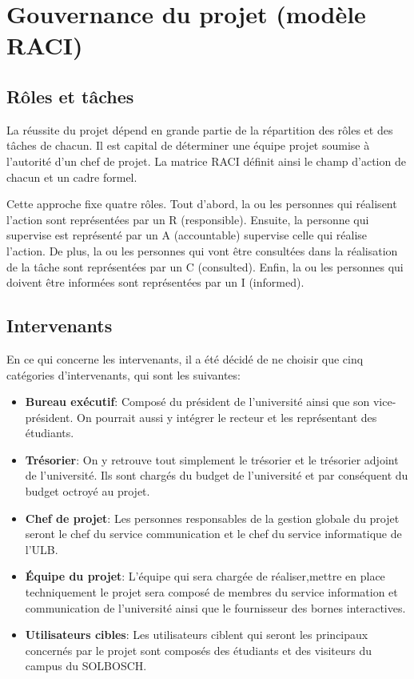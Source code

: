 \chapter{Gouvernance du projet (modèle RACI)}

\section{Rôles et tâches}
La réussite du projet dépend en grande partie de la répartition des rôles et des tâches de chacun.  Il est capital de déterminer une équipe projet soumise à l’autorité d’un chef de projet. La matrice RACI définit ainsi le champ d’action de chacun et un cadre formel. 

Cette approche fixe quatre rôles. Tout d’abord, la ou les personnes qui réalisent l’action sont représentées par un R (responsible).  Ensuite, la personne qui supervise est représenté par un A (accountable) supervise celle qui réalise l’action. De plus, la ou les personnes qui vont être consultées dans la réalisation de la tâche sont représentées par un C (consulted). Enfin, la ou les personnes qui doivent être informées sont représentées par un I (informed). 




\section{Intervenants}
En ce qui concerne les intervenants, il a été décidé de ne choisir que cinq catégories d’intervenants, qui sont les suivantes:

\begin{itemize}
    \item \textbf{Bureau exécutif}: Composé du président de l’université ainsi que son vice-président. On pourrait aussi y intégrer le recteur et les représentant des étudiants. 

    \item \textbf{Trésorier}: On y retrouve tout simplement le trésorier et le trésorier adjoint de l’université. Ils sont chargés du budget de l’université et par conséquent du budget octroyé au projet. 

    \item \textbf{Chef de projet}: Les personnes responsables de la gestion globale du projet seront le chef du service communication et le chef du service informatique de l’ULB. 

    \item \textbf{Équipe du projet}: L’équipe qui sera chargée de réaliser,mettre en place techniquement le projet sera composé de membres du service information et communication de l’université ainsi que le fournisseur des bornes interactives. 

    \item \textbf{Utilisateurs cibles}: Les utilisateurs ciblent qui seront les principaux concernés par le projet sont composés des étudiants et des visiteurs du campus du SOLBOSCH.      
    
\end{itemize}


